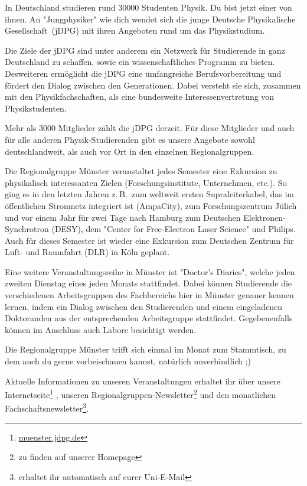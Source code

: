 \begin{multicols}{2}
In Deutschland studieren rund \num{30000} Studenten Physik.
Du bist jetzt einer von ihnen.
An "Jungphysiker" wie dich wendet sich die junge Deutsche Physikalische Gesellschaft~(jDPG) mit ihren Angeboten rund um das Physikstudium.

Die Ziele der jDPG sind unter anderem ein Netzwerk für Studierende in ganz Deutschland zu schaffen, sowie ein wissenschaftliches Programm zu bieten.
Desweiteren ermöglicht die jDPG eine umfangreiche Berufsvorbereitung und fördert den Dialog zwischen den Generationen.
Dabei versteht sie sich, zusammen mit den Physikfachschaften, als eine bundesweite Interessenvertretung von Physikstudenten.

Mehr als \num{3000} Mitglieder zählt die jDPG derzeit.
Für diese Mitglieder und auch für alle anderen Physik-Studierenden gibt es unsere Angebote sowohl deutschlandweit, als auch vor Ort in den einzelnen Regionalgruppen.

Die Regionalgruppe Münster veranstaltet jedes Semester eine Exkursion zu physikalisch interessanten Zielen (Forschungsinstitute, Unternehmen, etc.).
So ging es in den letzten Jahren z.\,B.\ zum weltweit ersten Supraleiterkabel, das im öffentlichen Stromnetz integriert ist (AmpaCity), zum Forschungszentrum Jülich und vor einem Jahr für zwei Tage nach Hamburg zum Deutschen Elektronen-Synchrotron (DESY), dem "Center for Free-Electron Laser Science" und Philips. Auch für dieses Semester ist wieder eine Exkursion zum Deutschen Zentrum für Luft- und Raumfahrt (DLR) in Köln geplant.

Eine weitere Veranstaltungsreihe in Münster ist "Doctor's Diaries", welche jeden zweiten Dienstag eines jeden Monats stattfindet.
Dabei können Studierende die verschiedenen Arbeitsgruppen des Fachbereichs hier in Münster genauer kennen lernen, indem ein Dialog zwischen den Studierenden und einem eingeladenen Doktoranden aus der entsprechenden Arbeitsgruppe stattfindet. Gegebenenfalls können im Anschluss auch Labore besichtigt werden.


Die Regionalgruppe Münster trifft sich einmal im Monat zum Stammtisch, zu dem auch du gerne vorbeischauen kannst, natürlich unverbindlich ;)


Aktuelle Informationen zu unseren Veranstaltungen erhaltet ihr über unsere Internetseite\footnote{\url{muenster.jdpg.de}} , unseren Regionalgruppen-Newsletter\footnote{zu finden auf unserer Homepage} und den monatlichen Fachschaftsnewsletter\footnote{erhaltet ihr automatisch auf eurer Uni-E-Mail}.


\end{multicols}
